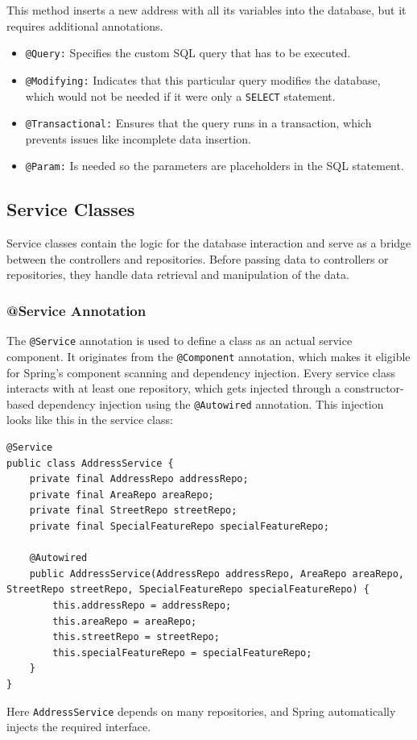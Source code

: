     This method inserts a new address with all its variables into the database, but it requires additional annotations.
    \begin{itemize}
        \item \texttt{@Query:} Specifies the custom SQL query that has to be executed.
        \item \texttt{@Modifying:} Indicates that this particular query modifies the database, which would not be needed if it were only a \texttt{SELECT} statement.
        \item \texttt{@Transactional:} Ensures that the query runs in a transaction, which prevents issues like incomplete data insertion.
        \item \texttt{@Param:} Is needed so the parameters are placeholders in the SQL statement.
    \end{itemize}

    \subsection{Service Classes}
    Service classes contain the logic for the database interaction and serve as a bridge between the controllers and repositories. Before passing data to controllers or repositories, they handle data retrieval and manipulation of the data.

    \subsubsection{@Service Annotation}
    The \texttt{@Service} annotation is used to define a class as an actual service component. It originates from the \texttt{@Component} annotation, which makes it eligible for Spring's component scanning and dependency injection. \newline
    Every service class interacts with at least one repository, which gets injected through a constructor-based dependency injection using the \texttt{@Autowired} annotation. This injection looks like this in the service class: 
    \lstset{style=mycsharp, caption=Repository Injection and @Service}
    \begin{lstlisting}
@Service
public class AddressService {        
    private final AddressRepo addressRepo;
    private final AreaRepo areaRepo;
    private final StreetRepo streetRepo;
    private final SpecialFeatureRepo specialFeatureRepo;

    @Autowired
    public AddressService(AddressRepo addressRepo, AreaRepo areaRepo, StreetRepo streetRepo, SpecialFeatureRepo specialFeatureRepo) {
        this.addressRepo = addressRepo;
        this.areaRepo = areaRepo;
        this.streetRepo = streetRepo;
        this.specialFeatureRepo = specialFeatureRepo;
    }
}
    \end{lstlisting}
    Here \texttt{AddressService} depends on many repositories, and Spring automatically injects the required interface. 

